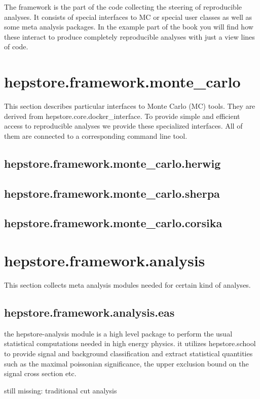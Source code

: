 
The framework is the part of the code collecting the steering of
reproducible analyses. It consists of special interfaces to MC or
special user classes as well as some meta analysis packages. In the
example part of the book you will find how these interact to produce
completely reproducible analyses with just a view lines of code.

\section{hepstore.framework.monte\_carlo}
This section describes particular interfaces to Monte Carlo (MC)
tools. They are derived from hepstore.core.docker\_interface. To
provide simple and efficient access to reproducible analyses we
provide these specialized interfaces. All of them are connected to a
corresponding command line tool.

\subsection{hepstore.framework.monte\_carlo.herwig}
\subsection{hepstore.framework.monte\_carlo.sherpa}
\subsection{hepstore.framework.monte\_carlo.corsika}

\section{hepstore.framework.analysis}
This section collects meta analysis modules needed for certain kind of analyses.

\subsection{hepstore.framework.analysis.eas}

the hepstore-analysis module is a high level package to perform the
usual statistical computations needed in high energy physics. it
utilizes hepstore.school to provide signal and background
classification and extract statistical quantities such as the maximal
poissonian significance, the upper exclusion bound on the signal cross
section etc.

still missing: traditional cut analysis
